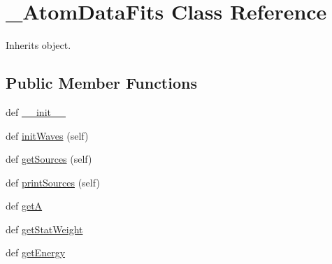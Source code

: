 \hypertarget{classpyneb_1_1core_1_1pynebcore_1_1___atom_data_fits}{}\section{\+\_\+\+Atom\+Data\+Fits Class Reference}
\label{classpyneb_1_1core_1_1pynebcore_1_1___atom_data_fits}


Inherits object.

\subsection*{Public Member Functions}
\begin{DoxyCompactItemize}
\item 
def \hyperlink{classpyneb_1_1core_1_1pynebcore_1_1___atom_data_fits_ac775ee34451fdfa742b318538164070e}{\+\_\+\+\_\+init\+\_\+\+\_\+}
\item 
def \hyperlink{classpyneb_1_1core_1_1pynebcore_1_1___atom_data_fits_aecb5df9a52e3983689ccddc2c20cc6f0}{init\+Waves} (self)
\item 
def \hyperlink{classpyneb_1_1core_1_1pynebcore_1_1___atom_data_fits_ada746cff051b4eefa5f61aa4ad0e7fa6}{get\+Sources} (self)
\item 
def \hyperlink{classpyneb_1_1core_1_1pynebcore_1_1___atom_data_fits_a8391e786a420d63ed15d4efd3f04aad5}{print\+Sources} (self)
\item 
def \hyperlink{classpyneb_1_1core_1_1pynebcore_1_1___atom_data_fits_a17192519660871ef6a77e6bdad6f580d}{get\+A}
\item 
def \hyperlink{classpyneb_1_1core_1_1pynebcore_1_1___atom_data_fits_a00fb8d8bc6381e46ebb1b76b2770442a}{get\+Stat\+Weight}
\item 
def \hyperlink{classpyneb_1_1core_1_1pynebcore_1_1___atom_data_fits_a8406acc27904d955ee4dbb458f60db52}{get\+Energy}
\end{DoxyCompactItemize}
